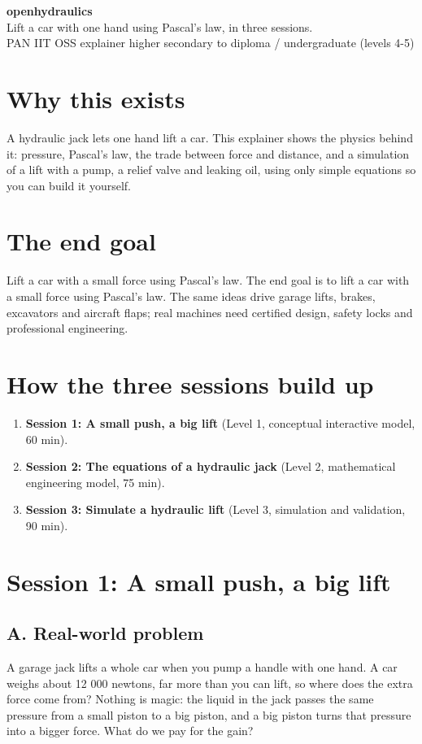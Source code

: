 \documentclass[11pt,a4paper]{article}
\begin{document}
\begin{center}{\LARGE\bfseries openhydraulics}\\[0.4em]{\large Lift a car with one hand using Pascal's law, in three sessions.}\\[0.2em]\small PAN IIT OSS explainer \textbullet{} higher secondary to diploma / undergraduate (levels 4-5)\end{center}

\section*{Why this exists}
A hydraulic jack lets one hand lift a car. This explainer shows the physics behind it: pressure, Pascal's law, the trade between force and distance, and a simulation of a lift with a pump, a relief valve and leaking oil, using only simple equations so you can build it yourself.

\section*{The end goal}
Lift a car with a small force using Pascal's law. The end goal is to lift a car with a small force using Pascal's law. The same ideas drive garage lifts, brakes, excavators and aircraft flaps; real machines need certified design, safety locks and professional engineering.

\section*{How the three sessions build up}
\begin{enumerate}[nosep]
\item \textbf{Session 1: A small push, a big lift} (Level 1, conceptual interactive model, 60 min).
\item \textbf{Session 2: The equations of a hydraulic jack} (Level 2, mathematical engineering model, 75 min).
\item \textbf{Session 3: Simulate a hydraulic lift} (Level 3, simulation and validation, 90 min).
\end{enumerate}

\section{Session 1: A small push, a big lift}

\subsection*{A. Real-world problem}
A garage jack lifts a whole car when you pump a handle with one hand. A car weighs about 12 000 newtons, far more than you can lift, so where does the extra force come from? Nothing is magic: the liquid in the jack passes the same pressure from a small piston to a big piston, and a big piston turns that pressure into a bigger force. What do we pay for the gain?
\end{document}

